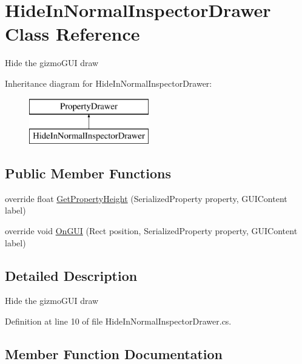 \hypertarget{class_hide_in_normal_inspector_drawer}{}\section{Hide\+In\+Normal\+Inspector\+Drawer Class Reference}
\label{class_hide_in_normal_inspector_drawer}


Hide the gizmo\+G\+UI draw  


Inheritance diagram for Hide\+In\+Normal\+Inspector\+Drawer\+:\begin{figure}[H]
\begin{center}
\leavevmode
\includegraphics[height=2.000000cm]{class_hide_in_normal_inspector_drawer}
\end{center}
\end{figure}
\subsection*{Public Member Functions}
\begin{DoxyCompactItemize}
\item 
override float \mbox{\hyperlink{class_hide_in_normal_inspector_drawer_aa96246a562a27100e3d94fb80143d8f5}{Get\+Property\+Height}} (Serialized\+Property property, G\+U\+I\+Content label)
\item 
override void \mbox{\hyperlink{class_hide_in_normal_inspector_drawer_a144ed49e4a5bf182e4ebc0e18fad2dcb}{On\+G\+UI}} (Rect position, Serialized\+Property property, G\+U\+I\+Content label)
\end{DoxyCompactItemize}


\subsection{Detailed Description}
Hide the gizmo\+G\+UI draw 



Definition at line 10 of file Hide\+In\+Normal\+Inspector\+Drawer.\+cs.



\subsection{Member Function Documentation}
\mbox{\label{class_hide_in_normal_inspector_drawer_aa96246a562a27100e3d94fb80143d8f5}} 
